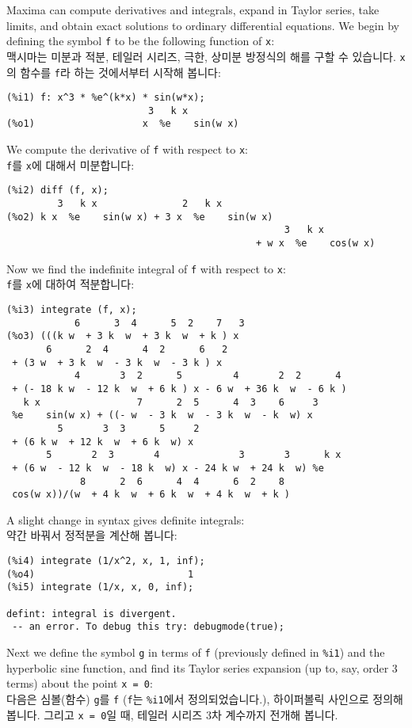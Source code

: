 \documentclass[a4paper,12pt]{article}
\begin{document}
Maxima can compute derivatives and integrals, expand in Taylor series, 
take limits, and obtain exact solutions to ordinary differential 
equations.  We begin by defining the symbol {\tt f} to be the
following function of {\tt x}: \\
맥시마는 미분과 적분, 테일러 시리즈, 극한, 상미분 방정식의 해를 구할 수 
있습니다. {\tt x}의 함수를 {\tt f}라 하는 것에서부터 시작해 봅니다:
\begin{verbatim}
(%i1) f: x^3 * %e^(k*x) * sin(w*x);
                         3   k x
(%o1)                   x  %e    sin(w x)
\end{verbatim}
We compute the derivative of {\tt f} with respect to {\tt x}: \\
{\tt f}를 {\tt x}에 대해서 미분합니다:
\begin{verbatim}
(%i2) diff (f, x);
         3   k x               2   k x
(%o2) k x  %e    sin(w x) + 3 x  %e    sin(w x)
                                                 3   k x
                                            + w x  %e    cos(w x)
\end{verbatim}
Now we find the indefinite integral of {\tt f} with respect to {\tt x}: \\
{\tt f}를 {\tt x}에 대하여 적분합니다:
\begin{verbatim}
(%i3) integrate (f, x);
            6      3  4      5  2    7   3
(%o3) (((k w  + 3 k  w  + 3 k  w  + k ) x
       6      2  4      4  2      6   2
 + (3 w  + 3 k  w  - 3 k  w  - 3 k ) x
            4       3  2      5         4       2  2      4
 + (- 18 k w  - 12 k  w  + 6 k ) x - 6 w  + 36 k  w  - 6 k )
   k x                 7      2  5      4  3    6     3
 %e    sin(w x) + ((- w  - 3 k  w  - 3 k  w  - k  w) x
         5       3  3      5     2
 + (6 k w  + 12 k  w  + 6 k  w) x
       5       2  3       4              3       3      k x
 + (6 w  - 12 k  w  - 18 k  w) x - 24 k w  + 24 k  w) %e
             8      2  6      4  4      6  2    8
 cos(w x))/(w  + 4 k  w  + 6 k  w  + 4 k  w  + k )
\end{verbatim}
A slight change in syntax gives definite integrals: \\
약간 바꿔서 정적분을 계산해 봅니다:
\begin{verbatim}
(%i4) integrate (1/x^2, x, 1, inf);
(%o4)                           1
(%i5) integrate (1/x, x, 0, inf);

defint: integral is divergent.
 -- an error. To debug this try: debugmode(true);
\end{verbatim}
Next we define the symbol {\tt g} in terms of {\tt f} (previously 
defined in {\tt \%i1}) and the hyperbolic sine function, and find its 
Taylor series expansion (up to, say, order 3 terms) about the point 
{\tt x = 0}: \\
다음은 심볼(함수) {\tt g}를 {\tt f} ({\tt f}는 {\tt \%i1}에서 
정의되었습니다.), 하이퍼볼릭 사인으로 정의해봅니다.  
그리고 {\tt x = 0}일 때, 테일러 시리즈 3차 계수까지 전개해 봅니다. \\
\end{document}
